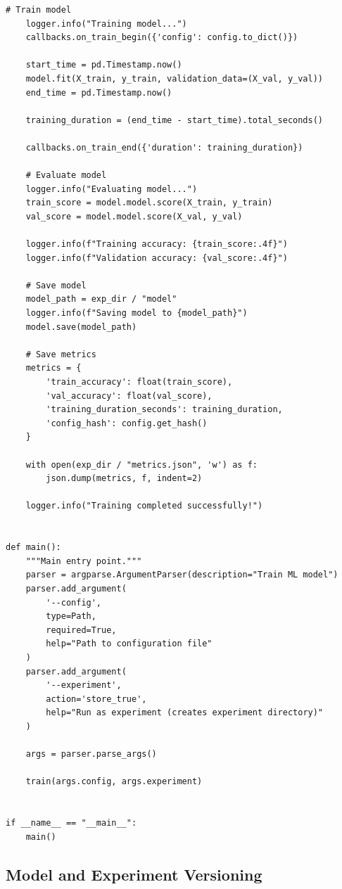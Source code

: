 \begin{lstlisting}[style=python, caption=Fully reproducible training script]
    # Train model
    logger.info("Training model...")
    callbacks.on_train_begin({'config': config.to_dict()})

    start_time = pd.Timestamp.now()
    model.fit(X_train, y_train, validation_data=(X_val, y_val))
    end_time = pd.Timestamp.now()

    training_duration = (end_time - start_time).total_seconds()

    callbacks.on_train_end({'duration': training_duration})

    # Evaluate model
    logger.info("Evaluating model...")
    train_score = model.model.score(X_train, y_train)
    val_score = model.model.score(X_val, y_val)

    logger.info(f"Training accuracy: {train_score:.4f}")
    logger.info(f"Validation accuracy: {val_score:.4f}")

    # Save model
    model_path = exp_dir / "model"
    logger.info(f"Saving model to {model_path}")
    model.save(model_path)

    # Save metrics
    metrics = {
        'train_accuracy': float(train_score),
        'val_accuracy': float(val_score),
        'training_duration_seconds': training_duration,
        'config_hash': config.get_hash()
    }

    with open(exp_dir / "metrics.json", 'w') as f:
        json.dump(metrics, f, indent=2)

    logger.info("Training completed successfully!")


def main():
    """Main entry point."""
    parser = argparse.ArgumentParser(description="Train ML model")
    parser.add_argument(
        '--config',
        type=Path,
        required=True,
        help="Path to configuration file"
    )
    parser.add_argument(
        '--experiment',
        action='store_true',
        help="Run as experiment (creates experiment directory)"
    )

    args = parser.parse_args()

    train(args.config, args.experiment)


if __name__ == "__main__":
    main()
\end{lstlisting}

\subsection{Model and Experiment Versioning}

